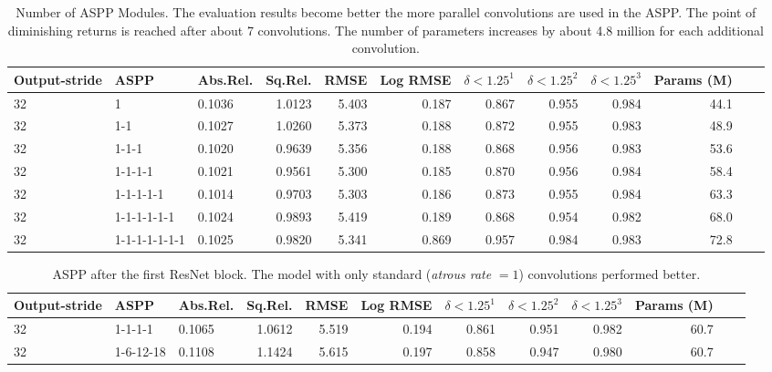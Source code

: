 \begin{table}[ht]
    \centering
    \setlength{\tabcolsep}{4pt}
    \begin{tabular}{lllrrrrrrrrr}
    \toprule
     Output-stride & ASPP &  Abs.Rel. &  Sq.Rel. &   RMSE &  Log RMSE &     $\delta < 1.25^1$ &     $\delta < 1.25^2$ &     $\delta < 1.25^3$ &      Params (M) \\
    \midrule 
           32  &  1             &   0.1036  &  1.0123  &  5.403  &  0.187  &  0.867  &  0.955  &  0.984 & 44.1 \\
           32  &  1-1           &   0.1027  &  1.0260  &  5.373  &  0.188  &  0.872  &  0.955  &  0.983 & 48.9 \\
           32  &  1-1-1         &   0.1020  &  0.9639  &  5.356  &  0.188  &  0.868  &  0.956  &  0.983 & 53.6 \\
           32  &  1-1-1-1       &   0.1021  &  0.9561  &  5.300  &  0.185  &  0.870  &  0.956  &  0.984 & 58.4 \\
           32  &  1-1-1-1-1     &   0.1014  &  0.9703  &  5.303  &  0.186  &  0.873  &  0.955  &  0.984 & 63.3 \\
           32  &  1-1-1-1-1-1   &   0.1024  &  0.9893  &  5.419  &  0.189  &  0.868  &  0.954  &  0.982 & 68.0 \\
           32  &  1-1-1-1-1-1-1 &   0.1025  &  0.9820  &  5.341  &  0.869 &  0.957  &  0.984  &  0.983 & 72.8 \\
    \bottomrule
    \end{tabular}
    \caption{Number of ASPP Modules. The evaluation results become better the more parallel convolutions are used in the ASPP. The point of diminishing returns is reached after about 7 convolutions. The number of parameters increases by about 4.8 million for each additional convolution.}
\end{table}


\begin{table}[ht]
    \centering
    \begin{tabular}{lllrrrrrrrrr}
    \toprule
     Output-stride & ASPP &  Abs.Rel. &  Sq.Rel. &   RMSE &  Log RMSE &     $\delta < 1.25^1$ &     $\delta < 1.25^2$ &     $\delta < 1.25^3$ &      Params (M)\\
    \midrule 
           32  &  1-1-1-1 &   0.1065 &     1.0612 &     5.519 &      0.194 &      0.861 &      0.951 &      0.982 & 60.7\\
           32  &  1-6-12-18 &   0.1108 &     1.1424 &      5.615 &      0.197 &      0.858 &      0.947 &      0.980 & 60.7\\
    \bottomrule
    \end{tabular}
    \caption{ASPP after the first ResNet block. The model with only standard (\textit{atrous rate} $=1$) convolutions performed better.}
    \label{table:appendix:aspp-encoder}
\end{table}


